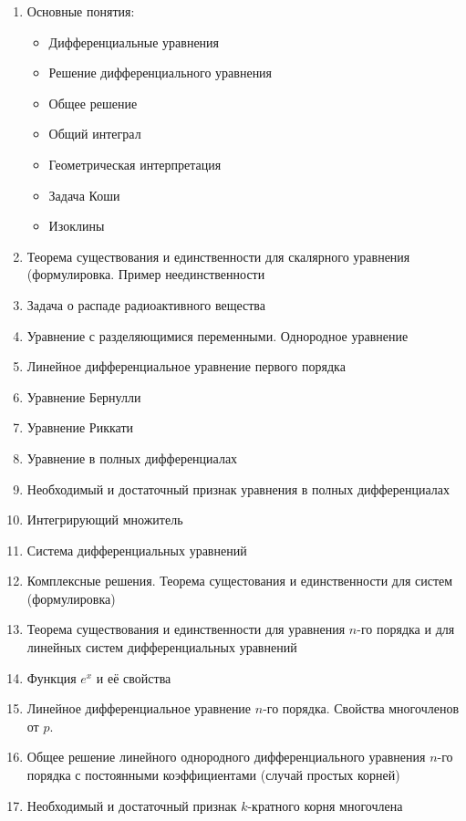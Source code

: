 \begin{enumerate}
\def\labelenumi{\arabic{enumi}.}

\item
  Основные понятия:

  \begin{itemize}
  
  \item
    Дифференциальные уравнения
  \item
    Решение дифференциального уравнения
  \item
    Общее решение
  \item
    Общий интеграл
  \item
    Геометрическая интерпретация
  \item
    Задача Коши
  \item
    Изоклины
  \end{itemize}
\item
  Теорема существования и единственности для скалярного уравнения
  (формулировка. Пример неединственности
\item
  Задача о распаде радиоактивного вещества
\item
  Уравнение с разделяющимися переменными. Однородное уравнение
\item
  Линейное дифференциальное уравнение первого порядка
\item
  Уравнение Бернулли
\item
  Уравнение Риккати
\item
  Уравнение в полных дифференциалах
\item
  Необходимый и достаточный признак уравнения в полных дифференциалах
\item
  Интегрирующий множитель
\item
  Система дифференциальных уравнений
\item
  Комплексные решения. Теорема сущестования и единственности для систем
  (формулировка)
\item
  Теорема существования и единственности для уравнения \(n\)-го порядка
  и для линейных систем дифференциальных уравнений
\item
  Функция \(e^x\) и её свойства
\item
  Линейное дифференциальное уравнение \(n\)-го порядка. Свойства
  многочленов от \(p\).
\item
  Общее решение линейного однородного дифференциального уравнения
  \(n\)-го порядка с постоянными коэффициентами (случай простых корней)
\item
  Необходимый и достаточный признак \(k\)-кратного корня многочлена

\end{enumerate}
